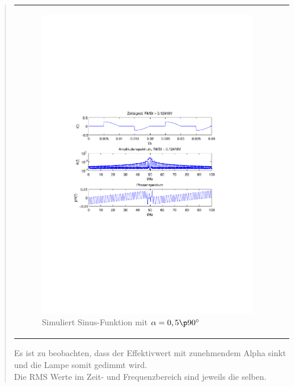 \begin{quote}
\begin{center}
\begin{tabular}{ll}
            \begin{minipage}{0.6\textwidth}
                \begin{figure}[H]
                    \label{fig:pico_sin_f-50_a-00}
                    \includegraphics[scale=0.55, trim = 35mm 100mm 35mm 95mm, clip]{Bilder/sin_f-50_a-0,5}
                    \caption{Simuliert Sinus-Funktion mit $\alpha = 0,5 \p 90^\circ$}
                \end{figure}
        
            \end{minipage}
        
        \end{tabular}
        \end{center}


        Es ist zu beobachten, dass der Effektivwert mit zunehmendem Alpha sinkt und die Lampe somit gedimmt wird.\\
        Die RMS Werte im Zeit- und Frequenzbereich sind jeweils die selben.



\end{quote}
